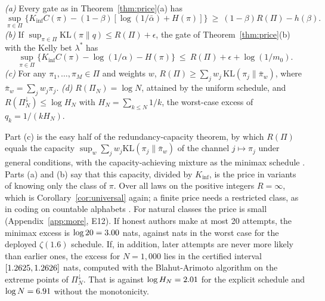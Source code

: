 \begin{proposition}\label{prop:minimax}
\emph{(a)} Every gate as in Theorem~\ref{thm:price}(a) has
\[\sup_{\pi\in\Pi}\big\{K_{\inf}C(\pi)-(1-\beta)[\log(1/\bar\alpha)+H(\pi)]\big\}\ \ge\ (1-\beta)R(\Pi)-h(\beta).\]
\emph{(b)} If $\sup_{\pi\in\Pi}\mathrm{KL}(\pi\|q)\le R(\Pi)+\epsilon$, the gate of Theorem~\ref{thm:price}(b) with the Kelly bet $\lambda^*$ has
\[\sup_{\pi\in\Pi}\big\{K_{\inf}C(\pi)-\log(1/\alpha)-H(\pi)\big\}\ \le\ R(\Pi)+\epsilon+\log(1/m_0).\]
\emph{(c)} For any $\pi_1,\dots,\pi_M\in\Pi$ and weights $w$, $R(\Pi)\ge\sum_jw_j\,\mathrm{KL}(\pi_j\|\bar\pi_w)$, where $\bar\pi_w=\sum_jw_j\pi_j$.
\emph{(d)} $R(\Pi_N)=\log N$, attained by the uniform schedule, and $R(\Pi_N^{\downarrow})\le\log H_N$ with $H_N=\sum_{k\le N}1/k$, the worst-case excess of $q_k=1/(kH_N)$.
\end{proposition}
Part (c) is the easy half of the redundancy-capacity theorem, by which $R(\Pi)$ equals the capacity $\sup_w\sum_jw_j\mathrm{KL}(\pi_j\|\bar\pi_w)$ of the channel $j\mapsto\pi_j$ under general conditions, with the capacity-achieving mixture as the minimax schedule \citep{haussler1997general,merhav1995strong}. Parts (a) and (b) say that this capacity, divided by $K_{\inf}$, is the price in variants of knowing only the class of $\pi$. Over all laws on the positive integers $R=\infty$, which is Corollary~\ref{cor:universal} again; a finite price needs a restricted class, as in coding on countable alphabets \citep{boucheron2009coding}. For natural classes the price is small (Appendix~\ref{app:more}, E12). If honest authors make at most 20 attempts, the minimax excess is $\log20=3.00$ nats, against \NScZetaWorstTwenty{} nats in the worst case for the deployed $\zeta(1.6)$ schedule. If, in addition, later attempts are never more likely than earlier ones, the excess for $N=1{,}000$ lies in the certified interval $[1.2625,1.2626]$ nats, computed with the Blahut-Arimoto algorithm \citep{blahut1972computation,arimoto1972algorithm} on the extreme points of $\Pi_N^{\downarrow}$. That is against $\log H_N=2.01$ for the explicit schedule and $\log N=6.91$ without the monotonicity.

